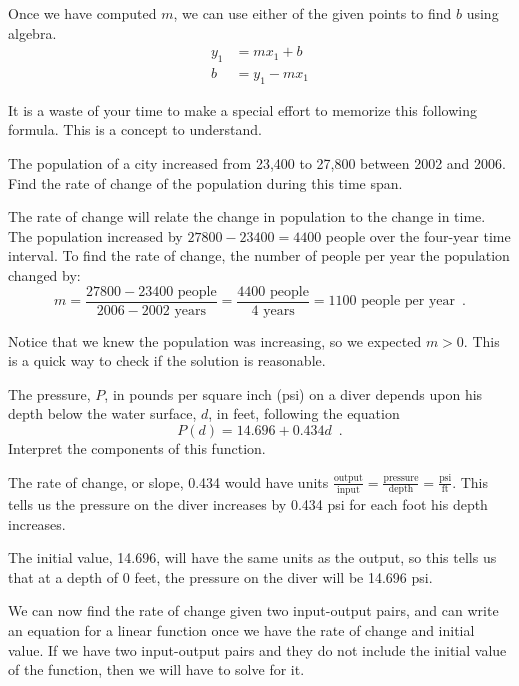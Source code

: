 Once we have computed $m$, we can use either of the given points to find $b$ using algebra.
\begin{align*}
y_1 &= mx_1 + b \\
b &= y_1 - mx_1
\end{align*}
\begin{remark} It is a waste of your time to make a special effort to memorize this following formula. This is a concept to understand.
\end{remark}
\begin{example}
The population of a city increased from 23,400 to 27,800 between 2002 and 2006. Find the rate of change of the population during this time span.

\begin{solution} The rate of change will relate the change in population to the change in time. The population increased by $27800-23400 = 4400$ people over the four-year time interval. To find the rate of change, the number of people per year the population changed by:
$$m = \frac{27800-23400 \mbox{ people}}{2006 - 2002 \mbox{ years}} = \frac{4400\mbox{ people}}{4\mbox{ years}} = 1100 \mbox{ people per year} \enspace .$$
\end{solution}\end{example}
Notice that we knew the population was increasing, so we expected $m>0$. This is a quick way to check if the solution is reasonable.

\begin{example}
The pressure, $P$, in pounds per square inch (psi) on a diver depends upon his depth below the water surface, $d$, in feet, following the equation
$$P(d)=14.696+0.434d \enspace .$$
Interpret the components of this function.

\begin{solution} The rate of change, or slope, 0.434 would have units 
$\frac{\mbox{output}}{\mbox{input}} = \frac{\mbox{pressure}}{\mbox{depth}}=\frac{\mbox{psi}}{\mbox{ft}}$. This tells us the pressure on the diver increases by 0.434 psi for each foot his depth increases.

The initial value, 14.696, will have the same units as the output, so this tells us that at a depth of 0 feet, the pressure on the diver will be 14.696 psi.
\end{solution}\end{example}

We can now find the rate of change given two input-output pairs, and can write an equation for a linear function once we have the rate of change and initial value. If we have two input-output pairs and they do not include the initial value of the function, then we will have to solve for it.

